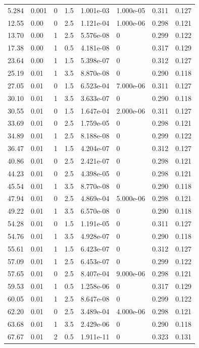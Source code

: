 \documentclass[preview]{standalone}
\begin{document}
{{\begin{tabular}{L{1.2cm}C{1.2cm} C{0.3cm}C{0.5cm} C{1.4cm}C{1.4cm} C{1.4cm}C{1.4cm}}
  5.284  &  0.001  & 0     & 1.5 &  1.001e-03  & 1.000e-05  & 0.311 &  0.127   \\ 
  12.55  &  0.00  & 0     & 2.5 &  1.121e-04  & 1.000e-06  & 0.298 &  0.121   \\ 
  13.70  &  0.00  & 1     & 2.5 &  5.576e-08  & 0  & 0.299 &  0.122   \\ 
  17.38  &  0.00  & 1     & 0.5 &  4.181e-08  & 0  & 0.317 &  0.129   \\ 
  23.64  &  0.00  & 1     & 1.5 &  5.398e-07  & 0  & 0.312 &  0.127   \\ 
  25.19  &  0.01  & 1     & 3.5 &  8.870e-08  & 0  & 0.290 &  0.118   \\ 
  27.05  &  0.01  & 0     & 1.5 &  6.523e-04  & 7.000e-06  & 0.311 &  0.127   \\ 
  30.10  &  0.01  & 1     & 3.5 &  3.633e-07  & 0  & 0.290 &  0.118   \\ 
  30.55  &  0.01  & 0     & 1.5 &  1.647e-04  & 2.000e-06  & 0.311 &  0.127   \\ 
  33.69  &  0.01  & 0     & 2.5 &  1.759e-05  & 0  & 0.298 &  0.121   \\ 
  34.89  &  0.01  & 1     & 2.5 &  8.188e-08  & 0  & 0.299 &  0.122   \\ 
  36.47  &  0.01  & 1     & 1.5 &  4.204e-07  & 0  & 0.312 &  0.127   \\ 
  40.86  &  0.01  & 0     & 2.5 &  2.421e-07  & 0  & 0.298 &  0.121   \\ 
  44.23  &  0.01  & 0     & 2.5 &  4.398e-05  & 0  & 0.298 &  0.121   \\ 
  45.54  &  0.01  & 1     & 3.5 &  8.770e-08  & 0  & 0.290 &  0.118   \\ 
  47.94  &  0.01  & 0     & 2.5 &  4.869e-04  & 5.000e-06  & 0.298 &  0.121   \\ 
  49.22  &  0.01  & 1     & 3.5 &  6.570e-08  & 0  & 0.290 &  0.118   \\ 
  54.28  &  0.01  & 0     & 1.5 &  1.191e-05  & 0  & 0.311 &  0.127   \\ 
  54.76  &  0.01  & 1     & 3.5 &  4.928e-07  & 0  & 0.290 &  0.118   \\ 
  55.61  &  0.01  & 1     & 1.5 &  6.423e-07  & 0  & 0.312 &  0.127   \\ 
  57.09  &  0.01  & 1     & 2.5 &  6.453e-07  & 0  & 0.299 &  0.122   \\ 
  57.65  &  0.01  & 0     & 2.5 &  8.407e-04  & 9.000e-06  & 0.298 &  0.121   \\ 
  59.53  &  0.01  & 1     & 0.5 &  1.258e-06  & 0  & 0.317 &  0.129   \\ 
  60.05  &  0.01  & 1     & 2.5 &  8.647e-08  & 0  & 0.299 &  0.122   \\ 
  62.20  &  0.01  & 0     & 2.5 &  3.489e-04  & 4.000e-06  & 0.298 &  0.121   \\ 
  63.68  &  0.01  & 1     & 3.5 &  2.429e-06  & 0  & 0.290 &  0.118   \\ 
  67.67  &  0.01  & 2     & 0.5 &  1.911e-11  & 0  & 0.323 &  0.131   \\ 
\hline 
\end{tabular} 

}}
\end{document}
